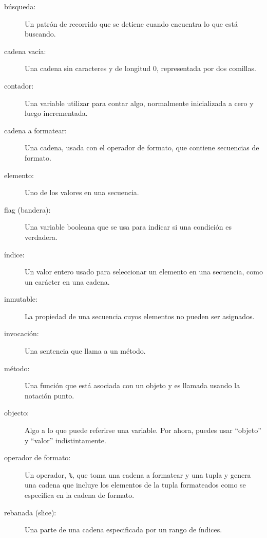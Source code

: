 \begin{description}

\item[búsqueda:] Un patrón de recorrido que se detiene
cuando encuentra lo que está buscando.

\item[cadena vacía:] Una cadena sin caracteres y de longitud 0, representada por
dos comillas.

\item[contador:] Una variable utilizar para contar algo, normalmente inicializada
a cero y luego incrementada.

\item[cadena a formatear:] Una cadena, usada con el operador de formato,
que contiene secuencias de formato.

\item[elemento:] Uno de los valores en una secuencia.

\item[flag (bandera):] Una variable booleana que se usa para indicar si
una condición es verdadera.

\item[índice:] Un valor entero usado para seleccionar un elemento en
una secuencia, como un carácter en una cadena.

\item[inmutable:] La propiedad de una secuencia cuyos elementos
no pueden ser asignados.

\item[invocación:] Una sentencia que llama a un método.

\item[método:] Una función que está asociada con un objeto y es llamada
usando la notación punto.

\item[objecto:] Algo a lo que puede referirse una variable. Por ahora,
puedes usar ``objeto'' y ``valor'' indistintamente.

\item[operador de formato:] Un operador, {\tt \%}, que toma una cadena 
a formatear y una tupla y genera una cadena que incluye
los elementos de la tupla formateados como se especifica en la cadena de formato.

\item[rebanada (slice):] Una parte de una cadena especificada por un rango de índices.


\end{description}
